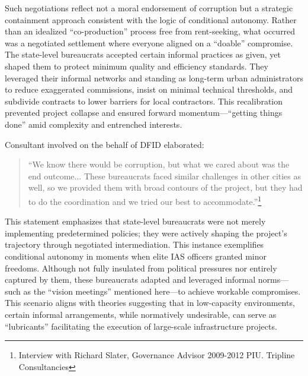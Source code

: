 Such negotiations reflect not a moral endorsement of corruption but a strategic containment approach consistent with the logic of conditional autonomy. Rather than an idealized “co-production” process free from rent-seeking, what occurred was a negotiated settlement where everyone aligned on a “doable” compromise. The state-level bureaucrats accepted certain informal practices as given, yet shaped them to protect minimum quality and efficiency standards. They leveraged their informal networks and standing as long-term urban administrators to reduce exaggerated commissions, insist on minimal technical thresholds, and subdivide contracts to lower barriers for local contractors. This recalibration prevented project collapse and ensured forward momentum—“getting things done” amid complexity and entrenched interests.

\vspace{12mm}

Consultant involved on the behalf of DFID elaborated:

\begin{quote}``We know there would be corruption, but what we cared about was the end outcome... These bureaucrats faced similar challenges in other cities as well, so we provided them with broad contours of the project, but they had to do the coordination and we tried our best to accommodate.”\footnote{Interview with Richard Slater, Governance Advisor 2009-2012 PIU. Tripline Consultancies} \end{quote}

This statement emphasizes that state-level bureaucrats were not merely implementing predetermined policies; they were actively shaping the project’s trajectory through negotiated intermediation. This instance exemplifies conditional autonomy in moments when elite IAS officers granted minor freedoms. Although not fully insulated from political pressures nor entirely captured by them, these bureaucrats adapted and leveraged informal norms—such as the “vision meetings” mentioned here—to achieve workable compromises. This scenario aligns with theories suggesting that in low-capacity environments, certain informal arrangements, while normatively undesirable, can serve as “lubricants” facilitating the execution of large-scale infrastructure projects.


